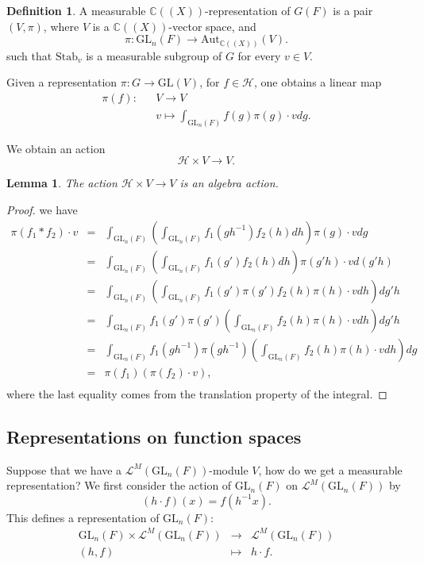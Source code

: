 \documentclass{amsart}
\newtheorem{lemma}[theorem]{Lemma}
\theoremstyle{definition}
\newtheorem{definition}[theorem]{Definition}
\theoremstyle{remark}
\numberwithin{equation}{section}
\def  \Aut      {\mathrm{Aut}}
\def  \GL        {\mathrm{GL}}
\def  \Stab     {\mathrm{Stab}}
\def  \ch       {\mathcal{H}}
\def  \cl       {\mathcal{L}}
\def  \bc       {\mathbb{C}}
\begin{document}
\begin{definition}
	A measurable $\bc((X))$-representation of $G(F)$ is a pair $(V, \pi)$, where $V$ is a $\bc((X))$-vector space, and 
	$$
	\pi: \GL_n(F) \to  \Aut_{\bc((X))}(V). 
	$$
	such that $\Stab_{v}$ is a measurable subgroup of $G$ for  every $v \in V$.
\end{definition}




Given a representation $\pi: G \to \GL(V)$,  for $f \in \ch $, one obtains a linear map
\begin{eqnarray*}
	\pi(f): &&V \to V   \\
	         && v  \mapsto  \int_{\GL_n(F)} f(g) \pi(g) \cdot v dg.
\end{eqnarray*}

 We obtain an action
$$
\ch  \times V \to V.
$$

\begin{lemma}
	The action $\ch  \times  V \to V$ is an algebra action.
\end{lemma}


\begin{proof}
	we have
	\begin{eqnarray*}
		\pi(f_1 * f_2) \cdot v & =& \int_{\GL_n(F)}    \left(\int_{\GL_n(F)}f_1(gh^{-1})f _2(h)  dh \right) \pi(g) \cdot v dg \\
		                               & =& \int_{\GL_n(F)}    \left(\int_{\GL_n(F)}f_1(g')f _2(h)  dh \right) \pi(g'h) \cdot v d (g'h) \\
		                                 &=& \int_{\GL_n(F)} \left(\int_{\GL_n(F)} f_1(g')  \pi(g') f_2(h)  \pi(h)  \cdot v   dh\right) dg 'h  \\
		                               & =& \int _{\GL_n(F)} f_1(g')  \pi(g')  \left(\int_{\GL_n(F)}  f_2(h)   \pi(h )  \cdot  v dh  \right)  dg'h   \\
		                                & =& \int _{\GL_n(F)} f_1(gh^{-1})  \pi(gh^{-1})  \left(\int_{\GL_n(F)}  f_2(h)   \pi(h )  \cdot  v dh  \right)  dg   \\
		                               & =&   \pi(f_1) (\pi(f_2)  \cdot v),        \\
	\end{eqnarray*}
	where the last equality comes from the translation property of the integral.
\end{proof}


\subsection{Representations on function spaces}
Suppose that we have a $\cl^{M}(\GL_n(F))$-module $V$, how do we get a measurable representation?   We first consider the action of $\GL_n(F)$ on $\cl^M(\GL_n(F))$ by
$$
(h \cdot f) (x) = f(h^{-1}x).
$$
This defines a representation of $\GL_n(F)$:
\begin{eqnarray*}
\GL_n(F) \times \cl^M(\GL_n(F))& \to&  \cl^M(\GL_n(F)) \\
                  (h, f)   & \mapsto&   h\cdot f.
\end{eqnarray*}
\end{document}
